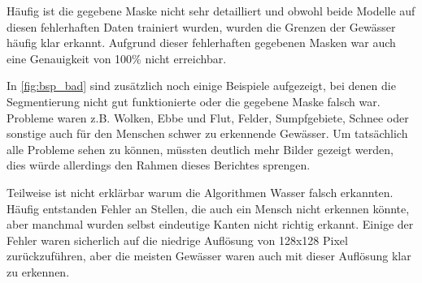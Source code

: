 Häufig ist die gegebene Maske nicht sehr detailliert 
und obwohl beide Modelle auf diesen fehlerhaften Daten trainiert wurden,
wurden die Grenzen der Gewässer häufig klar erkannt.
Aufgrund dieser fehlerhaften gegebenen Masken war auch eine Genauigkeit von 100\% nicht erreichbar.

In \autoref{fig:bsp_bad} sind zusätzlich noch einige Beispiele aufgezeigt, 
bei denen die Segmentierung nicht gut funktionierte 
oder die gegebene Maske falsch war.
Probleme waren z.B. Wolken, Ebbe und Flut, Felder, Sumpfgebiete, Schnee oder sonstige auch für den Menschen schwer zu erkennende Gewässer.
Um tatsächlich alle Probleme sehen zu können, müssten deutlich mehr Bilder gezeigt werden, dies würde allerdings den Rahmen dieses Berichtes sprengen.

Teilweise ist nicht erklärbar warum die Algorithmen Wasser falsch erkannten.
Häufig entstanden Fehler an Stellen, die auch ein Mensch nicht erkennen könnte, aber manchmal wurden selbst eindeutige Kanten nicht richtig erkannt.
Einige der Fehler waren sicherlich auf die niedrige Auflösung von 128x128 Pixel zurückzuführen, aber die meisten Gewässer waren auch mit dieser Auflösung klar zu erkennen.
